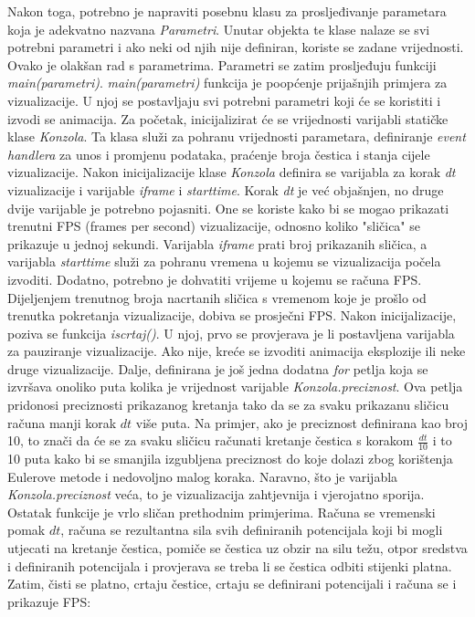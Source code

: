 \documentclass{foi}
\begin{document}
Nakon toga, potrebno je napraviti posebnu klasu za prosljeđivanje parametara koja je adekvatno nazvana \textit{Parametri}. Unutar objekta te klase nalaze se svi potrebni parametri i ako neki od njih nije definiran, koriste se zadane vrijednosti. Ovako je olakšan rad s parametrima. Parametri se zatim prosljeđuju funkciji \textit{main(parametri)}. \textit{main(parametri)} funkcija je poopćenje prijašnjih primjera za vizualizacije. U njoj se postavljaju svi potrebni parametri koji će se koristiti i izvodi se animacija. Za početak, inicijalizirat će se vrijednosti varijabli statičke klase \textit{Konzola}. Ta klasa služi za pohranu vrijednosti parametara, definiranje \textit{event handlera} za unos i promjenu podataka, praćenje broja čestica i stanja cijele vizualizacije. Nakon inicijalizacije klase \textit{Konzola} definira se varijabla za korak \textit{dt} vizualizacije i varijable \textit{iframe} i \textit{starttime}. Korak \textit{dt} je već objašnjen, no druge dvije varijable je potrebno pojasniti. One se koriste kako bi se mogao prikazati trenutni FPS (frames per second) vizualizacije, odnosno koliko "sličica" se prikazuje u jednoj sekundi. Varijabla \textit{iframe} prati broj prikazanih sličica, a varijabla \textit{starttime} služi za pohranu vremena u kojemu se vizualizacija počela izvoditi. Dodatno, potrebno je dohvatiti vrijeme u kojemu se računa FPS. Dijeljenjem trenutnog broja nacrtanih sličica s vremenom koje je prošlo od trenutka pokretanja vizualizacije, dobiva se prosječni FPS. Nakon inicijalizacije, poziva se funkcija \textit{iscrtaj()}. U njoj, prvo se provjerava je li postavljena varijabla za pauziranje vizualizacije. Ako nije, kreće se izvoditi animacija eksplozije ili neke druge vizualizacije. Dalje, definirana je još jedna dodatna \textit{for} petlja koja se izvršava onoliko puta kolika je vrijednost varijable \textit{Konzola.preciznost}. Ova petlja pridonosi preciznosti prikazanog kretanja tako da se za svaku prikazanu sličicu računa manji korak $dt$ više puta. Na primjer, ako je preciznost definirana kao broj 10, to znači da će se za svaku sličicu računati kretanje čestica s korakom $\frac{dt}{10}$ i to 10 puta kako bi se smanjila izgubljena preciznost do koje dolazi zbog korištenja Eulerove metode i nedovoljno malog koraka. Naravno, što je varijabla \textit{Konzola.preciznost} veća, to je vizualizacija zahtjevnija i vjerojatno sporija. Ostatak funkcije je vrlo sličan prethodnim primjerima. Računa se vremenski pomak $dt$, računa se rezultantna sila svih definiranih potencijala koji bi mogli utjecati na kretanje čestica, pomiče se čestica uz obzir na silu težu, otpor sredstva i definiranih potencijala i provjerava se treba li se čestica odbiti stijenki platna. Zatim, čisti se platno, crtaju čestice, crtaju se definirani potencijali i računa se i prikazuje FPS:
\end{document}
